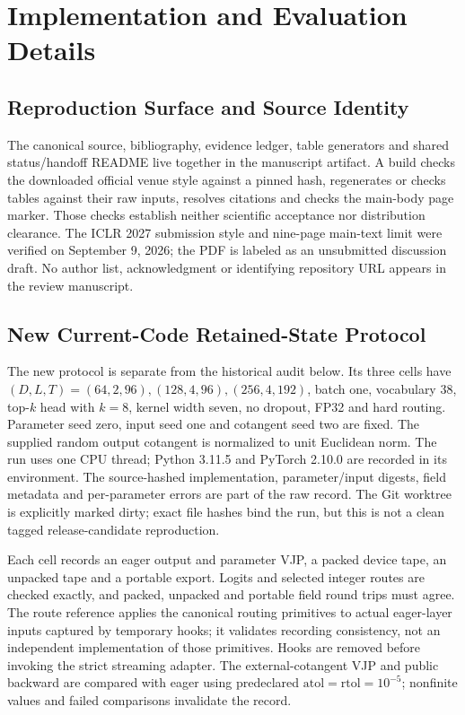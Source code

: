 \section{Implementation and Evaluation Details}
\label{app:methods}

\subsection{Reproduction Surface and Source Identity}

The canonical source, bibliography, evidence ledger, table generators and
shared status/handoff README live together in the manuscript artifact. A build checks
the downloaded official venue style against a pinned hash, regenerates or
checks tables against their raw inputs, resolves citations and checks the
main-body page marker. Those checks establish neither scientific acceptance
nor distribution clearance. The ICLR 2027 submission style and nine-page
main-text limit were verified on September 9, 2026; the PDF is labeled as an
unsubmitted discussion draft. No author list, acknowledgment or identifying
repository URL appears in the review manuscript.

\subsection{New Current-Code Retained-State Protocol}
\label{app:current-protocol}

The new protocol is separate from the historical audit below. Its three
cells have $(D,L,T)=(64,2,96),(128,4,96),(256,4,192)$, batch one, vocabulary
38, top-$k$ head with $k=8$, kernel width seven, no dropout, FP32 and hard routing. Parameter seed
zero, input seed one and cotangent seed two are fixed. The supplied random
output cotangent is normalized to unit Euclidean norm. The run uses one CPU
thread; Python 3.11.5 and PyTorch 2.10.0 are recorded in its environment.
The source-hashed implementation, parameter/input digests, field metadata
and per-parameter errors are part of the raw record. The Git worktree is
explicitly marked dirty; exact file hashes bind the run, but this is not a
clean tagged release-candidate reproduction.

Each cell records an eager output and parameter VJP, a packed device tape,
an unpacked tape and a portable export. Logits and selected integer routes
are checked exactly, and packed, unpacked and portable field round trips
must agree. The route reference applies the canonical routing primitives
to actual eager-layer inputs captured by temporary hooks; it validates
recording consistency, not an independent implementation of those
primitives. Hooks are removed before invoking the strict streaming adapter.
The external-cotangent VJP and public  backward are
compared with eager using predeclared $\mathrm{atol}=\mathrm{rtol}=10^{-5}$;
nonfinite values and failed comparisons invalidate the record.


